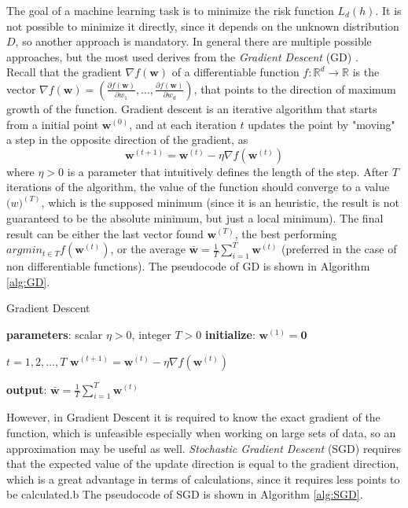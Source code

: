 The goal of a machine learning task is to minimize the risk function $L_d(h)$. It is not possible to minimize it directly, since it depends on the unknown distribution $D$, so another approach is mandatory. In general there are multiple possible approaches, but the most used derives from the \textit{Gradient Descent} (GD) \cite{article-gs-sgd}. \\
Recall that the gradient $\nabla f(\mathbf{w})$ of a differentiable function $f: \mathbb{R}^d \rightarrow \mathbb{R}$ is the vector  $\nabla f(\mathbf{w}) = \left( \frac{\partial f(\mathbf{w})}{\partial w_1}, \dots, \frac{\partial f(\mathbf{w})}{\partial w_d} \right)$, that points to the direction of maximum growth of the function. Gradient descent is an iterative algorithm that starts from a initial point $\mathbf{w}^{(0)}$, and at each iteration $t$ updates the point by "moving" a step in the opposite direction of the gradient, as
\[ \mathbf{w}^{(t+1)} = \mathbf{w}^{(t)} - \eta \nabla f(\mathbf{w}^{(t)}) \]
where $\eta > 0$ is a parameter that intuitively defines the length of the step. After $T$ iterations of the algorithm, the value of the function should converge to a value $\mathbf(w)^{(T)}$, which is the supposed minimum (since it is an heuristic, the result is not guaranteed to be the absolute minimum, but just a local minimum). The final result can be either the last vector found $\mathbf{w}^{(T)}$, the best performing $argmin_{t \in T} f(\mathbf{w}^{(t)})$, or the average $\mathbf{\bar{w}} = \frac{1}{T} \sum_{i=1}^{T} \mathbf{w}^{(t)}$ (preferred in the case of non differentiable functions). The pseudocode of GD is shown in Algorithm \ref{alg:GD}.

\begin{algorithm}
\caption{Gradient Descent}\label{alg:GD}
\begin{algorithmic}[1]
	\State \textbf{parameters}: scalar $\eta > 0$, integer $T>0$
	\State \textbf{initialize}: $\mathbf{w}^{(1)} = \mathbf{0}$
	
	\For $t = 1, 2, \dots , T$
	\State $\mathbf{w}^{(t+1)} = \mathbf{w}^{(t)} - \eta \nabla f(\mathbf{w}^{(t)})$
	\EndFor
	
	\State \textbf{output}: $\mathbf{\bar{w}} = \frac{1}{T} \sum_{i=1}^{T} \mathbf{w}^{(t)}$
\end{algorithmic}
\end{algorithm}


However, in Gradient Descent it is required to know the exact gradient of the function, which is unfeasible especially when working on large sets of data, so an approximation may be useful as well. \textit{Stochastic Gradient Descent} (SGD) requires that the expected value of the update direction is equal to the gradient direction, which is a great advantage in terms of calculations, since it requires less points to be calculated.b The pseudocode of SGD is shown in Algorithm \ref{alg:SGD}.



